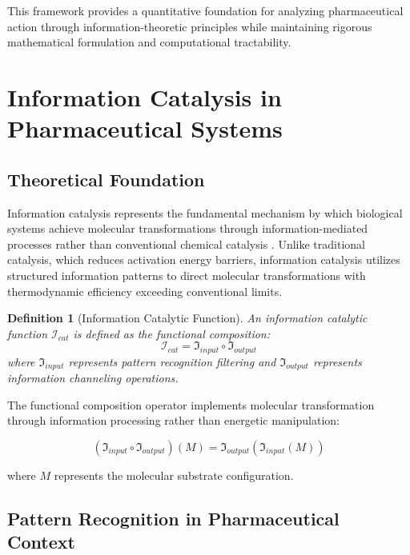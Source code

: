 \documentclass[12pt,a4paper]{article}
\newtheorem{definition}{Definition}[section]
\begin{document}
This framework provides a quantitative foundation for analyzing pharmaceutical action through information-theoretic principles while maintaining rigorous mathematical formulation and computational tractability.

\section{Information Catalysis in Pharmaceutical Systems}

\subsection{Theoretical Foundation}

Information catalysis represents the fundamental mechanism by which biological systems achieve molecular transformations through information-mediated processes rather than conventional chemical catalysis \citep{landauer1961irreversibility, bennett1982thermodynamics}. Unlike traditional catalysis, which reduces activation energy barriers, information catalysis utilizes structured information patterns to direct molecular transformations with thermodynamic efficiency exceeding conventional limits.

\begin{definition}[Information Catalytic Function]
An information catalytic function $\mathcal{I}_{cat}$ is defined as the functional composition:
\begin{equation}
\mathcal{I}_{cat} = \mathfrak{I}_{input} \circ \mathfrak{I}_{output}
\end{equation}
where $\mathfrak{I}_{input}$ represents pattern recognition filtering and $\mathfrak{I}_{output}$ represents information channeling operations.
\end{definition}

The functional composition operator implements molecular transformation through information processing rather than energetic manipulation:

\begin{equation}
(\mathfrak{I}_{input} \circ \mathfrak{I}_{output})(M) = \mathfrak{I}_{output}(\mathfrak{I}_{input}(M))
\end{equation}

where $M$ represents the molecular substrate configuration.

\subsection{Pattern Recognition in Pharmaceutical Context}
\end{document}

